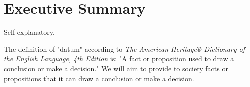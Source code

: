 \section{Executive Summary}
Self-explanatory.

The definition of "datum" according to \emph{The American Heritage® Dictionary of the English Language, 4th Edition} is: "A fact or proposition used to draw a conclusion or make a decision." We will aim to provide to society facts or propositions that it can draw a conclusion or make a decision.